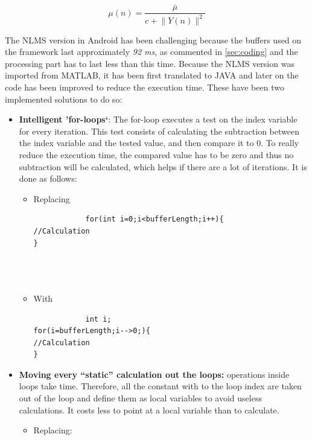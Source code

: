 \documentclass[11pt,a4paper,english]{book}  %
\theoremstyle{definition}  %
\theoremstyle{plain}  %
\theoremstyle{remark}  %
\begin{document}
		
		
	\begin{equation}
	\label{eq:nlms}
		\mu (n)=\frac{\bar{\mu}}{c+\lVert Y(n)\rVert^2}
	\end{equation}
	
	The NLMS version in Android has been challenging because the buffers used on the framework last approximately \textit{92 ms}, as commented in \ref{sec:coding} and the processing part has to last less than this time. Because the NLMS version was imported from MATLAB, it has been first translated to JAVA and later on the code has been improved to reduce the execution time. These have been two implemented solutions to do so:
	
	\begin{itemize}
	\item \textbf{Intelligent 'for-loops`}: The for-loop executes a test on the index variable for every iteration. This test consists of calculating the subtraction between the index variable and the tested value, and then compare it to $0$. To really reduce the execution time, the compared value has to be zero and thus no subtraction will be calculated, which helps if there are a lot of iterations. It is done as follows:
	
		\begin{itemize}
			\item Replacing
			
			\begin{lstlisting}
			for(int i=0;i<bufferLength;i++){
//Calculation
}

			
			
			\end{lstlisting}
			
			\item With
			
			\begin{lstlisting}
			int i;
for(i=bufferLength;i-->0;){
//Calculation
}

			\end{lstlisting}
		\end{itemize}
	
	\item \textbf{Moving every “static” calculation out the loops:}  operations inside loops take time. Therefore, all the constant with to the loop index are taken out of the loop and define them as local variables to avoid useless calculations. It costs less to point at a local variable than to calculate.
	
	\begin{itemize}
	\item Replacing:
	

\end{itemize}
\end{itemize}
\end{document}
